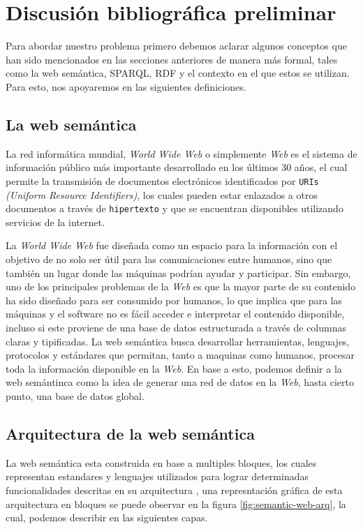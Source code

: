 \documentclass[conference,compsoc]{IEEEtran}
\begin{document}
\section{Discusión bibliográfica preliminar}

Para abordar nuestro problema primero debemos aclarar algunos conceptos que han sido
mencionados en las secciones anteriores de manera más formal, tales como la web semántica, SPARQL, RDF y el
contexto en el que estos se utilizan. Para esto, nos apoyaremos en las siguientes definiciones.

    \subsection{La web semántica}

La red informática mundial, \textit{World Wide Web} o simplemente \textit{Web} es el sistema de información público más importante
desarrollado en los últimos 30 años, el cual permite la transmisión de documentos electrónicos identificados
por \texttt{URIs} \textit{(Uniform Resource Identifiers)}, los cuales pueden estar enlazados a otros documentos
a través de \texttt{hipertexto} y que se encuentran disponibles utilizando servicios de la internet.

La \textit{World Wide Web} fue diseñada como un espacio para la información con el objetivo de no solo ser
útil para las comunicaciones entre humanos, sino que también un lugar donde las máquinas podrían ayudar y participar.
Sin embargo, uno de los principales problemas de la \textit{Web} es que la mayor parte de su contenido ha sido
diseñado para ser consumido por humanos, lo que implica que para las máquinas y el software no es fácil acceder 
e interpretar el contenido disponible, incluso si este proviene de una base de datos estructurada a través de
columnas claras y tipificadas. La web semántica busca desarrollar herramientas,
lenguajes, protocolos y estándares que permitan, tanto a maquinas como humanos, procesar toda la información disponible en la
\textit{Web}. En base a esto, podemos definir a la web semántinca como la idea de generar
una red de datos en la \textit{Web}, hasta cierto punto, una base de datos global. \cite{berners1998semantic}

    \subsection{Arquitectura de la web semántica}

La web semántica esta construida en base a multiples bloques, los cuales representan estandares y lenguajes
utilizados para lograr determinadas funcionalidades descritas en su arquitectura \cite{harth2011semantic}, una represntación gráfica
de esta arquitectura en bloques se puede observar en la figura \ref{fig:semantic-web-arq}, la cual,
podemos describir en las siguientes capas.
\end{document}
